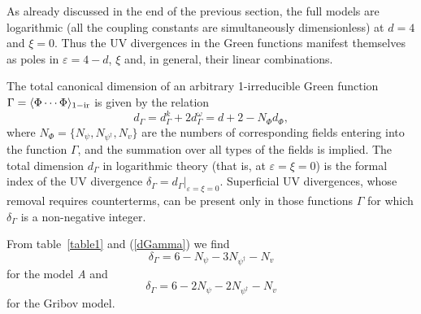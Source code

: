 \documentclass[12pt]{iopart}
\begin{document}
As already discussed in the end of the previous section, the full models are
logarithmic (all the coupling constants are simultaneously dimensionless) at
$d=4$ and $\xi=0$. Thus the UV divergences in the Green functions manifest
themselves as poles in $\varepsilon = 4-d$, $\xi$ and, in general, their linear
combinations.

The total canonical dimension of an arbitrary 1-irreducible Green function
$\Gamma = \langle\Phi \cdots \Phi \rangle _{\rm 1-ir}$
is given by the relation \cite{Book3}
\begin{equation}
d_{\Gamma }=d_{\Gamma }^k+2d_{\Gamma }^{\omega }= d+2-N_{\Phi }d_{\Phi},
\label{dGamma}
\end{equation}
where $N_{\Phi}=\{N_{\psi},N_{\psi^{\dag}}, N_{v}\}$ are the numbers of
corresponding fields entering into the function $\Gamma$, and the summation
over all types of the fields is implied. The total dimension $d_{\Gamma}$
in logarithmic theory (that is, at $\varepsilon=\xi=0$) is the formal index of the
UV divergence $\delta_{\Gamma}=d_{\Gamma}|_{\varepsilon=\xi=0}$. Superficial UV
divergences, whose removal requires counterterms, can be present only in
those functions $\Gamma$ for which $\delta_{\Gamma}$ is a non-negative
integer.

From table~\ref{table1} and (\ref{dGamma}) we find
\begin{equation}
\delta_{\Gamma}= 6 - N_{\psi} - 3N_{\psi^{\dag}} - N_{v}
\label{IndeA}
\end{equation}
for the model {\it A} and
\begin{equation}
\delta_{\Gamma}= 6 - 2N_{\psi} - 2N_{\psi^{\dag}} - N_{v}
\label{IndeG}
\end{equation}
for the Gribov model.
\end{document}
